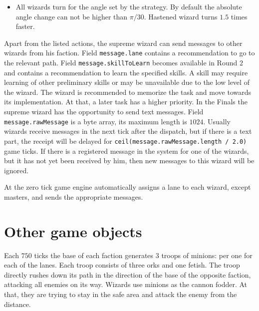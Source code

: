 \begin{itemize}
    \item All wizards turn for the angle set by the strategy. By default the absolute angle change can not be higher than $\pi / 30$.
          Hastened wizard turns $1.5$ times faster.
\end{itemize}
 
 
Apart from the listed actions, the supreme wizard can send messages to other wizards from his faction. Field
\texttt{message.lane} contains a recommendation to go to the relevant path. Field \texttt{message.skillToLearn} becomes available
in Round $2$ and contains a recommendation to learn the specified skills. A skill may require learning of other preliminary skills or may be
unavailable due to the low level of the wizard. The wizard is recommended to memorize the task and move towards
its implementation. At that, a later task has a higher priority. In the Finals the supreme wizard has
the opportunity to send text messages. Field \texttt{message.rawMessage} is a byte array, its maximum length is
$1024$. Usually wizards receive messages in the next tick after the dispatch, but if there is a text part, the receipt
will be delayed for \texttt{ceil(message.rawMessage.length / 2.0)} game ticks. If there is a registered message in the system for one of the
wizards, but it has not yet been received by him, then new messages to this wizard will be ignored.

At the zero tick game engine automatically assigns a lane to each wizard, except masters, and sends the appropriate messages.
 
\section{Other game objects}
 
Each $750$ ticks the base of each faction generates $3$ troops of minions: per one for each of the lanes. Each troop consists of three orks
and one fetish. The troop directly rushes down its path in the direction of the base of the opposite faction, attacking all enemies on its way.
Wizards use minions as the cannon fodder. At that, they are trying to stay in the safe area and attack the enemy from
the distance.
 
